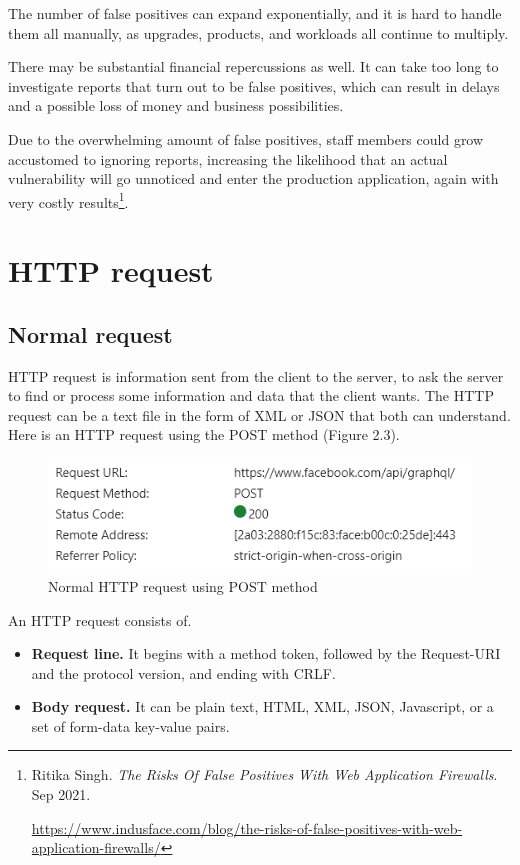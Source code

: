 The number of false positives can expand exponentially, and it is hard to handle them all manually, as upgrades, products, and workloads all continue to multiply.

There may be substantial financial repercussions as well. It can take too long to investigate reports that turn out to be false positives, which can result in delays and a possible loss of money and business possibilities.

Due to the overwhelming amount of false positives, staff members could grow accustomed to ignoring reports, increasing the likelihood that an actual vulnerability will go unnoticed and enter the production application, again with very costly results\footnote{Ritika Singh. \textit{The Risks Of False Positives With Web Application Firewalls}. Sep 2021. \raggedright\url{https://www.indusface.com/blog/the-risks-of-false-positives-with-web-application-firewalls/}}.


\section{HTTP request}
\subsection{Normal request}
\hspace{0.5cm}HTTP request is information sent from the client to the server, to ask the server to find or process some information and data that the client wants. The HTTP request can be a text file in the form of XML or JSON that both can understand. Here is an HTTP request using the POST method (Figure 2.3).
\begin{figure}[h!]
	\centering
	\includegraphics[width=\linewidth, height=3cm,keepaspectratio]{figures/normal request.png}
	\caption{Normal HTTP request using POST method}
\end{figure}

\hspace{0.5cm}An HTTP request consists of.
\begin{itemize}
	\item \textbf{Request line.} It begins with a method token, followed by the Request-URI and the protocol version, and ending with CRLF.
	\item \textbf{Body request.} It can be plain text, HTML, XML, JSON, Javascript, or a set of form-data key-value pairs.
\end{itemize}
